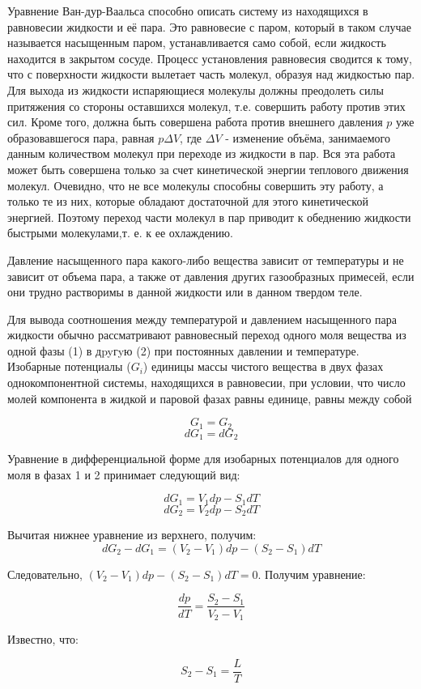 \documentclass[a4paper,10pt]{article} %
\begin{document}
Уравнение Ван-дур-Ваальса способно описать систему из находящихся в равновесии жидкости и её пара. Это равновесие с паром, 
который в таком случае называется насыщенным паром, устанавливается само собой, если жидкость находится в 
закрытом сосуде. Процесс установления равновесия сводится к тому, что с поверхности жидкости вылетает часть 
молекул, образуя над жидкостью пар. Для выхода из жидкости испаряющиеся молекулы должны преодолеть силы притяжения 
со стороны оставшихся молекул, т.е. совершить работу против этих сил. Кроме того, должна быть совершена работа 
против внешнего давления $p$ уже образовавшегося пара, равная $p \Delta V$, где $\Delta V$ - изменение объёма,
занимаемого данным количеством молекул при переходе из жидкости в пар. Вся эта работа может быть совершена 
только за счет кинетической энергии теплового движения молекул. Очевидно, что не все молекулы способны совершить 
эту работу, а только те из них, которые обладают достаточной для этого кинетической энергией. Поэтому переход 
части молекул в пар приводит к обеднению жидкости быстрыми молекулами,т. е. к ее охлаждению.

Давление насыщенного пара какого-либо вещества зависит от температуры и не зависит от объема пара, а также 
от давления других газообразных примесей, если они трудно растворимы в данной жидкости или в данном твердом теле.

Для вывода соотношения между температурой и давлением насыщенного пара жидкости обычно рассматривают равновесный 
переход одного моля вещества из одной фазы (1) в дpyгyю (2) при постоянных давлении и температуре. Изобарные 
потенциалы ($G_i$) единицы массы чистого вещества в двух фазах однокомпонентной системы, находящихся в равновесии, 
при условии, что число молей компонента в жидкой и паровой фазах равны единице, равны между собой

\[G_1 = G_2\]
\[dG_1 = dG_2\]

Уравнение в дифференциальной форме для  изобарных потенциалов для одного моля в фазах 1 и 2 принимает следующий вид:

\[dG_1 = V_1dp - S_1dT\]
\[dG_2 = V_2dp - S_2dT\]

Вычитая нижнее уравнение из верхнего, получим:
\[dG_2 - dG_1 = (V_2-V_1)dp - (S_2-S_1)dT \]

Следовательно, $(V_2-V_1)dp - (S_2 - S_1)dT = 0$.
Получим уравнение:

\[\frac{dp}{dT} = \frac{S_2 - S_1}{V_2-V_1}\]

Известно, что:

\[S_2 - S_1 = \frac{L}{T}\]
\end{document}
